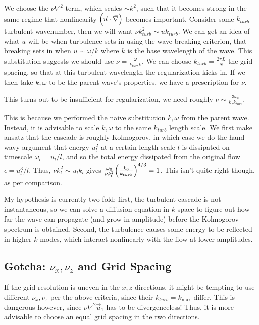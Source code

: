\documentclass[11pt,
        usenames, %
        dvipsnames %
    ]{report}
\DeclarePairedDelimiter\p{\lparen}{\rparen}
\begin{document}
We choose the $\nu \nabla^2$ term, which scales $\sim k^2$, such that it becomes
strong in the same regime that nonlinearity $\p*{\vec{u} \cdot \vec{\nabla}}$
becomes important. Consider some $k_{turb}$ turbulent wavenumber, then we will
want $\nu k_{turb}^2 \sim uk_{turb}$. We can get an idea of what $u$ will be
when turbulence sets in using the wave breaking criterion, that breaking sets in
when $u \sim \omega/k$ where $k$ is the base wavelength of the wave. This
substitution suggests we should use $\nu = \frac{\omega}{k_{turb}k}$. We can
choose $k_{turb} = \frac{2\pi L}{N}$ the grid spacing, so that at this turbulent
wavelength the regularization kicks in. If we then take $k, \omega$ to be the
parent wave's properties, we have a prescription for $\nu$.

This turns out to be insufficient for regularization, we need roughly $\nu \sim
\frac{3\omega_0}{k_zk_{turb}}$.

This is because we performed the naive substitution $k, \omega$ from the parent
wave. Instead, it is advisable to scale $k, \omega$ to the same $k_{turb}$
length scale. We first make ansatz that the cascade is roughly Kolmogorov, in
which case we do the hand-wavy argument that energy $u_l^2$ at a certain length
scale $l$ is dissipated on timescale $\omega_l = u_l / l$, and so the total
energy dissipated from the original flow $\epsilon = u_l^3/l$. Thus, $\nu k_l^2
\sim u_lk_l$ gives $\frac{\omega_0}{\nu k_0^2}\p*{\frac{k_0}{k_{turb}}}^{4/3} =
1$. This isn't quite right though, as per comparison.

My hypothesis is currently two fold: first, the turbulent cascade is not
instantaneous, so we can solve a diffusion equation in $k$ space to figure out
how far the wave can propagate (and grow in amplitude) before the Kolmogorov
spectrum is obtained. Second, the turbulence causes some energy to be reflected
in higher $k$ modes, which interact nonlinearly with the flow at lower
amplitudes.

\subsection{Gotcha: $\nu_x, \nu_z$ and Grid Spacing}

If the grid resolution is uneven in the $x, z$ directions, it might be tempting
to use different $\nu_x, \nu_z$ per the above criteria, since their $k_{turb} =
k_{\max}$ differ. This is dangerous however, since $\nu \nabla^2 \vec{u}_1$ has
to be divergenceless! Thus, it is more advisable to choose an equal grid spacing
in the two directions.
\end{document}
